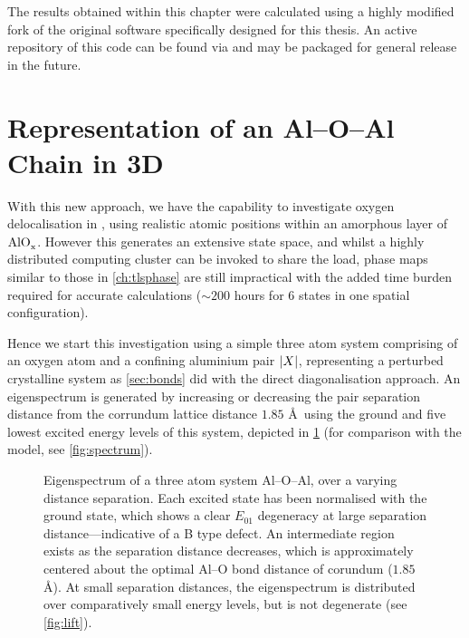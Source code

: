The results obtained within this chapter were calculated using a highly modified fork of the original software specifically designed for this thesis.
An active repository of this code can be found via  and may be packaged for general release in the future.

\section[Representation of an Al--O--Al Chain in \lin{3D}][Representation of an Al-O-Al Chain in \lin{3D}]{Representation of an Al--O--Al Chain in 3D}\label{sec:aloal3d}

With this new approach, we have the capability to investigate oxygen delocalisation in , using realistic atomic positions within an amorphous layer of $\ce{AlO_x}$.
However this generates an extensive state space, and whilst a highly distributed computing cluster can be invoked to share the load, phase maps similar to those in \cref{ch:tlsphase} are still impractical with the added time burden required for accurate calculations ($\sim 200$ hours for 6 states in one spatial configuration).

Hence we start this investigation using a simple three atom system comprising of an oxygen atom and a confining aluminium pair $\lvert X\rvert$, representing a perturbed crystalline system as \cref{sec:bonds} did with the direct diagonalisation approach.
An eigenspectrum is generated by increasing or decreasing the pair separation distance from the corrundum lattice distance $1.85$ \AA\ using the ground and five lowest excited energy levels of this system, depicted in \cref{fig:spect3d} (for comparison with the  model, see \cref{fig:spectrum}).

\begin{figure}[htp]
  \resizebox{0.9\textwidth}{!}{}
  \caption[Three Atom Eigenspectrum in ]{\label{fig:spect3d}Eigenspectrum of a three atom system Al--O--Al, over a varying distance separation. Each excited state has been normalised with the ground state, which shows a clear $E_{01}$ degeneracy at large separation distance---indicative of a B type defect. An intermediate region exists as the separation distance decreases, which is approximately centered about the optimal Al--O bond distance of corundum ($1.85$ \AA). At small separation distances, the eigenspectrum is distributed over comparatively small energy levels, but is not degenerate (see \cref{fig:lift}).}
\end{figure}

